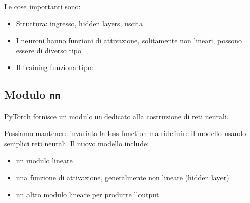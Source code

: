 Le cose importanti sono: 
\begin{itemize}
    \item Struttura: ingresso, hidden layers, uscita
    
    \item I neuroni hanno funzioni di attivazione, solitamente non lineari, possono essere di diverso tipo
    
    \item Il training funziona tipo:
    \begin{center}
        \begin{minipage}{.9\textwidth}
            \begin{tcolorbox}[
                colback=white,
                sharp corners,
                boxrule=.3mm,
                left=20pt,
                top=0pt,
                bottom=0pt,
                colbacktitle=white,
                coltitle=black
                ]
                \begin{algorithm}[H]
                    \caption{Training Process}
                \end{algorithm}
            \end{tcolorbox}
        \end{minipage}
    \end{center}
\end{itemize}

\subsection{Modulo \texttt{nn}}

PyTorch fornisce un modulo \texttt{nn} dedicato alla costruzione di reti neurali.

Possiamo mantenere invariata la loss function ma ridefinire il modello usando semplici reti neurali. Il nuovo modello include: 
\begin{itemize}
    \item un modulo lineare
    
    \item una funzione di attivazione, generalmente non lineare (hidden layer)
    
    \item un altro modulo lineare per produrre l'output
\end{itemize}

